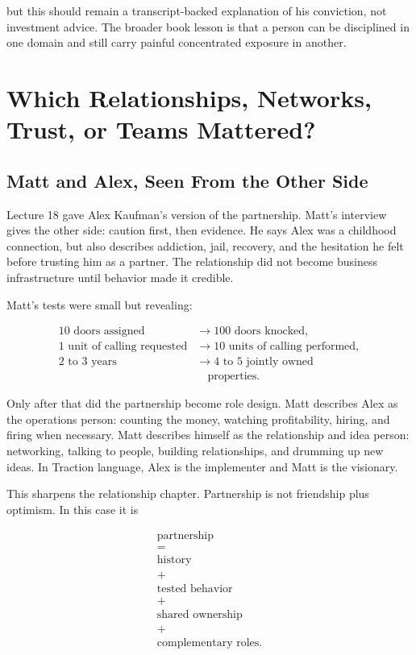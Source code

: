 \documentclass[11pt,oneside]{book}
\begin{document}
but this should remain a transcript-backed explanation of his conviction, not investment advice. The broader book lesson is that a person can be disciplined in one domain and still carry painful concentrated exposure in another.

\chapter{Which Relationships, Networks, Trust, or Teams Mattered?}

\section{Matt and Alex, Seen From the Other Side}

Lecture 18 gave Alex Kaufman's version of the partnership. Matt's interview gives the other side: caution first, then evidence. He says Alex was a childhood connection, but also describes addiction, jail, recovery, and the hesitation he felt before trusting him as a partner. The relationship did not become business infrastructure until behavior made it credible.

Matt's tests were small but revealing:

\begin{align}
10\text{ doors assigned}&\to100\text{ doors knocked},\\
1\text{ unit of calling requested}&\to10\text{ units of calling performed},\\
2\text{ to }3\text{ years}&\to4\text{ to }5\text{ jointly owned}\\
&\quad\text{properties}.
\end{align}

Only after that did the partnership become role design. Matt describes Alex as the operations person: counting the money, watching profitability, hiring, and firing when necessary. Matt describes himself as the relationship and idea person: networking, talking to people, building relationships, and drumming up new ideas. In Traction language, Alex is the implementer and Matt is the visionary.

This sharpens the relationship chapter. Partnership is not friendship plus optimism. In this case it is

\begin{equation}
\begin{gathered}
\text{partnership}\\
=\\
\text{history}\\
+\\
\text{tested behavior}\\
+\\
\text{shared ownership}\\
+\\
\text{complementary roles}.
\end{gathered}
\end{equation}
\end{document}
